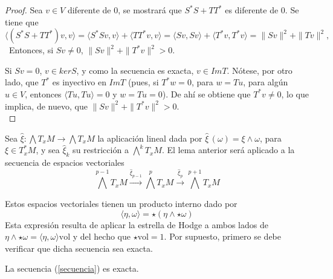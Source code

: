 \begin{proof}
Sea $v\in V$ diferente de 0, se mostrará que $S^{*}S+TT^{*}$ es diferente de 0. Se tiene que \[\langle (S^{*}S+TT^{*})v,v\rangle = \langle S^{*}Sv, v\rangle + \langle TT^{*}v, v\rangle = \langle Sv, Sv\rangle + \langle T^{*}v, T^{*}v\rangle = \|Sv\|^2+\|Tv\|^2,\]\
Entonces, si $Sv \neq 0$, $\|Sv\|^2+\|T^{*}v\|^2 > 0$.

Si $Sv = 0$, $v\in kerS$, y como la secuencia es exacta, $v\in ImT$. Nótese, por otro lado, que $T^{*}$ es inyectivo en $ImT$ (pues, si $T^{*}w = 0$, para $w = Tu$, para algún $u\in V$, entonces $\langle Tu,Tu \rangle = 0$ y $w = Tu = 0$). De ahí se obtiene que $T^{*}v \neq 0$, lo que implica, de nuevo, que $\|Sv\|^2+\|T^{*}v\|^2 > 0$.\\
\end{proof}

Sea $\hat\xi\colon\bigwedge T_xM \to
\bigwedge T_xM$ la aplicación lineal dada por $\hat\xi\, (\omega) = \xi \wedge \omega$, para $\xi\in T^{*}_xM$, y sea $\hat\xi_k$ su restricción a ${\bigwedge^k T_xM}$. El lema anterior será aplicado a la secuencia de espacios vectoriales
\begin{equation}
\label{secuencia}
\bigwedge^{p-1}T_xM \xrightarrow{\hat\xi_{p-1}}
\bigwedge^{p}T_xM \xrightarrow{\hat\xi_p}\bigwedge^{p+1}T_xM
\end{equation}

Estos espacios vectoriales tienen un producto interno dado por \[ \langle \eta,\omega\rangle = \star(\eta \wedge \star\omega)\]
Esta expresión resulta de aplicar la estrella de Hodge a ambos lados de 
$\eta \wedge \star\omega = \langle \eta,\omega\rangle \text{vol} $ y del hecho que $\star \text{vol} = 1$.
Por supuesto, primero se debe verificar que dicha secuencia sea exacta.

\begin{lem}
La secuencia (\ref{secuencia}) es exacta.
\end{lem}

